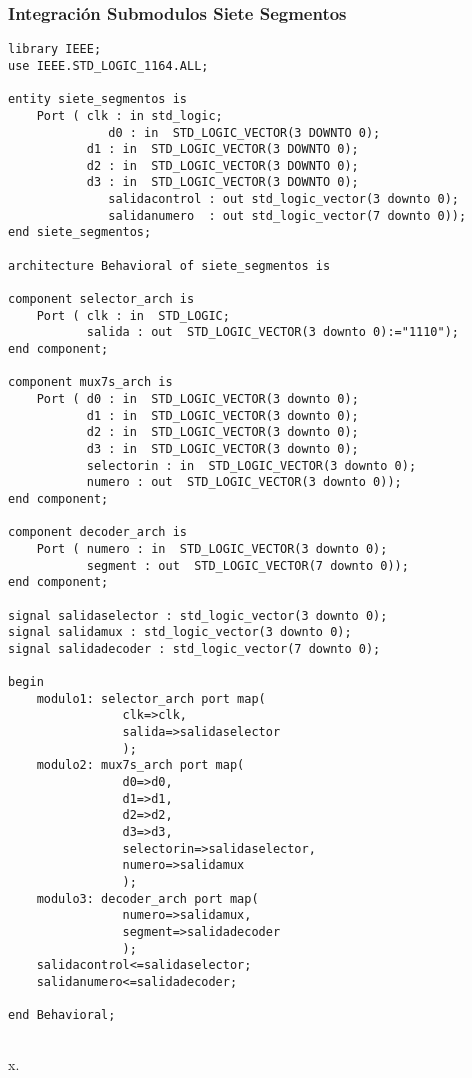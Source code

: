 \documentclass[a4paper]{article}
\begin{document}
\subsubsection{Integración Submodulos Siete Segmentos}
\begin{listing}[H]
	\begin{verbatim}
library IEEE;
use IEEE.STD_LOGIC_1164.ALL;

entity siete_segmentos is
    Port ( clk : in std_logic;
			  d0 : in  STD_LOGIC_VECTOR(3 DOWNTO 0);
           d1 : in  STD_LOGIC_VECTOR(3 DOWNTO 0);
           d2 : in  STD_LOGIC_VECTOR(3 DOWNTO 0);
           d3 : in  STD_LOGIC_VECTOR(3 DOWNTO 0);
			  salidacontrol : out std_logic_vector(3 downto 0);
			  salidanumero  : out std_logic_vector(7 downto 0));
end siete_segmentos;

architecture Behavioral of siete_segmentos is

component selector_arch is
    Port ( clk : in  STD_LOGIC;
           salida : out  STD_LOGIC_VECTOR(3 downto 0):="1110");
end component;

component mux7s_arch is
    Port ( d0 : in  STD_LOGIC_VECTOR(3 downto 0);
           d1 : in  STD_LOGIC_VECTOR(3 downto 0);
           d2 : in  STD_LOGIC_VECTOR(3 downto 0);
           d3 : in  STD_LOGIC_VECTOR(3 downto 0);
           selectorin : in  STD_LOGIC_VECTOR(3 downto 0);
           numero : out  STD_LOGIC_VECTOR(3 downto 0));
end component;

component decoder_arch is
    Port ( numero : in  STD_LOGIC_VECTOR(3 downto 0);
           segment : out  STD_LOGIC_VECTOR(7 downto 0));
end component;

signal salidaselector : std_logic_vector(3 downto 0);
signal salidamux : std_logic_vector(3 downto 0);
signal salidadecoder : std_logic_vector(7 downto 0);

begin
	modulo1: selector_arch port map(
				clk=>clk,
				salida=>salidaselector
				);
	modulo2: mux7s_arch port map(
				d0=>d0,
				d1=>d1,
				d2=>d2,
				d3=>d3,
				selectorin=>salidaselector,
				numero=>salidamux
				);
	modulo3: decoder_arch port map(
				numero=>salidamux,
				segment=>salidadecoder
				);
	salidacontrol<=salidaselector;
	salidanumero<=salidadecoder;

end Behavioral;


\end{verbatim}
\caption{x.}
    \label{mux2}
\end{listing}
\end{document}

